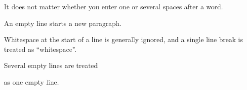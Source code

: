 \documentclass{article}
\begin{document}
It does not matter whether you
enter one or several     spaces
after a word.

An empty line starts a new
paragraph.

    Whitespace at the start of a line is generally ignored, and a single
    line break is treated as ``whitespace''.


Several empty lines are treated


as one empty line.
\end{document}
